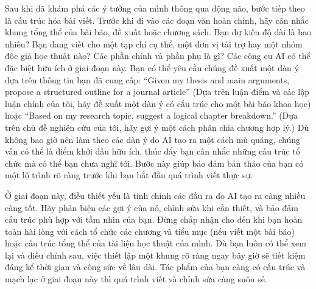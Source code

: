 Sau khi đã khám phá các ý tưởng của mình thông qua động não, bước tiếp theo là cấu trúc hóa bài viết. Trước khi đi vào các đoạn văn hoàn chỉnh, hãy cân nhắc khung tổng thể của bài báo, đề xuất hoặc chương sách. Bạn dự kiến độ dài là bao nhiêu? Bạn đang viết cho một tạp chí cụ thể, một đơn vị tài trợ hay một nhóm độc giả học thuật nào? Các phần chính và phần phụ là gì? Các công cụ AI có thể đặc biệt hữu ích ở giai đoạn này. Bạn có thể yêu cầu chúng đề xuất một dàn ý dựa trên thông tin bạn đã cung cấp: ``Given my thesis and main arguments, propose a structured outline for a journal article'' (Dựa trên luận điểm và các lập luận chính của tôi, hãy đề xuất một dàn ý có cấu trúc cho một bài báo khoa học) hoặc ``Based on my research topic, suggest a logical chapter breakdown.'' (Dựa trên chủ đề nghiên cứu của tôi, hãy gợi ý một cách phân chia chương hợp lý.) Dù không bao giờ nên làm theo các dàn ý do AI tạo ra một cách mù quáng, chúng vẫn có thể là điểm khởi đầu hữu ích, thúc đẩy bạn cân nhắc những cấu trúc tổ chức mà có thể bạn chưa nghĩ tới. Bước này giúp bảo đảm bản thảo của bạn có một lộ trình rõ ràng trước khi bạn bắt đầu quá trình viết thực sự.

Ở giai đoạn này, điều thiết yếu là tinh chỉnh các đầu ra do AI tạo ra càng nhiều càng tốt. Hãy phản biện các gợi ý của nó, chỉnh sửa khi cần thiết, và bảo đảm cấu trúc phù hợp với tầm nhìn của bạn. Đừng chấp nhận cho đến khi bạn hoàn toàn hài lòng với cách tổ chức các chương và tiểu mục (nếu viết một bài báo) hoặc cấu trúc tổng thể của tài liệu học thuật của mình. Dù bạn luôn có thể xem lại và điều chỉnh sau, việc thiết lập một khung rõ ràng ngay bây giờ sẽ tiết kiệm đáng kể thời gian và công sức về lâu dài. Tác phẩm của bạn càng có cấu trúc và mạch lạc ở giai đoạn này thì quá trình viết và chỉnh sửa càng suôn sẻ.

